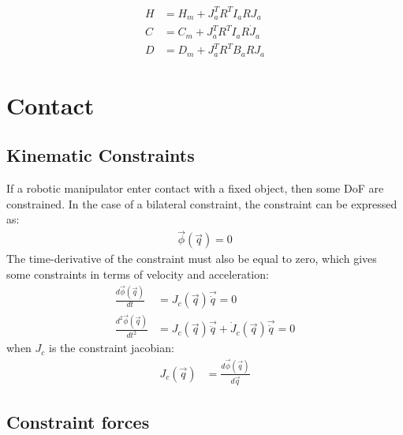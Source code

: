 \begin{align}
H   &= H_m + J_a^T R^T I_a R J_a        \\
C   &= C_m + J_a^T R^T I_a R \dot{J}_a  \\
D   &= D_m + J_a^T R^T B_a R J_a 
\label{eq:coord_transform}
\end{align}


\section{Contact}
\label{sec:contact}

\subsection{Kinematic Constraints}
\label{sec:constraints}
%
If a robotic manipulator enter contact with a fixed object, then some DoF are constrained. In the case of a bilateral constraint, the constraint can be expressed as:
\begin{align}
\vec{\phi}( \vec{ q } ) = 0
\label{eq:constraint}
\end{align}
%
The time-derivative of the constraint must also be equal to zero, which gives some constraints in terms of velocity and acceleration:
\begin{align}
\frac{d \vec{\phi}( \vec{ q } ) }{dt}     &= J_c( \vec{ q } ) \vec{\dot{q}}  = 0 \\
\frac{d^2 \vec{\phi}( \vec{ q } ) }{dt^2} &= J_c( \vec{ q } ) \vec{\ddot{q}}  + \dot{J}_c( \vec{ q } ) \vec{\dot{q}} = 0 
\label{eq:constraint_diff}
\end{align}
%
when $J_c$ is the constraint jacobian:
%
\begin{align}
J_c( \vec{ q } )                    &= \frac{d \vec{\phi}( \vec{ q } ) }{d\vec{ q }}
\label{eq:constraint_jaco}
\end{align}

\subsection{Constraint forces}
\label{sec:constraint_forces}


